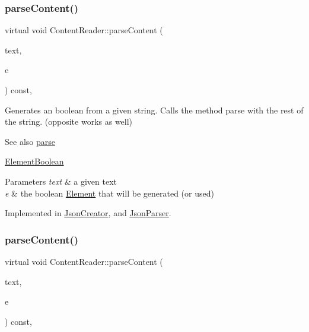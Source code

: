 \subsubsection{\texorpdfstring{parse\+Content()}{parseContent()}\hspace{0.1cm}{\footnotesize\ttfamily [3/6]}}
{\footnotesize\ttfamily virtual void Content\+Reader\+::parse\+Content (\begin{DoxyParamCaption}\item[{std\+::string \&}]{text,  }\item[{\mbox{\hyperlink{classElementBoolean}{Element\+Boolean}} $\ast$}]{e }\end{DoxyParamCaption}) const\hspace{0.3cm}{\ttfamily [pure virtual]}, {\ttfamily [inherited]}}

Generates an boolean from a given string. Calls the method parse with the rest of the string. (opposite works as well) \begin{DoxySeeAlso}{See also}
\mbox{\hyperlink{classContentReader_a7fff2e63a2e8fa216665604f69974e1d}{parse}} 

\mbox{\hyperlink{classElementBoolean}{Element\+Boolean}}
\end{DoxySeeAlso}

\begin{DoxyParams}{Parameters}
{\em text} & a given text \\
\hline
{\em e} & the boolean \mbox{\hyperlink{classElement}{Element}} that will be generated (or used) \\
\hline
\end{DoxyParams}


Implemented in \mbox{\hyperlink{classJsonCreator_a95fb65046a7467b8e48feaf92a62b40c}{Json\+Creator}}, and \mbox{\hyperlink{classJsonParser_a0857f5d286e5f0b973e2791e5e7a4e83}{Json\+Parser}}.

\mbox{\label{classContentReader_a91fdd738983dcc7a246c3c163007dfa9}} 
\subsubsection{\texorpdfstring{parse\+Content()}{parseContent()}\hspace{0.1cm}{\footnotesize\ttfamily [4/6]}}
{\footnotesize\ttfamily virtual void Content\+Reader\+::parse\+Content (\begin{DoxyParamCaption}\item[{std\+::string \&}]{text,  }\item[{\mbox{\hyperlink{classElementArray}{Element\+Array}} $\ast$}]{e }\end{DoxyParamCaption}) const\hspace{0.3cm}{\ttfamily [pure virtual]}, {\ttfamily [inherited]}}

